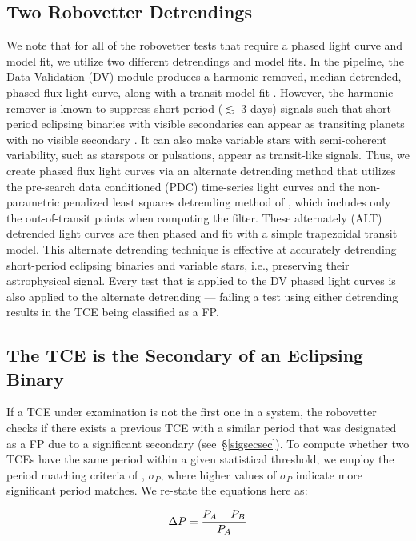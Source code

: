 \subsection{Two Robovetter Detrendings}
We note that for all of the robovetter tests that require a phased light curve and model fit, we utilize two different detrendings and model fits. In the \kepler{} pipeline, the Data Validation (DV) module produces a harmonic-removed, median-detrended, phased flux light curve, along with a transit model fit \citep{Wu2010}. However, the harmonic remover is known to suppress short-period ($\lesssim$ 3 days) signals such that short-period eclipsing binaries with visible secondaries can appear as transiting planets with no visible secondary \citep{Christiansen2013b}. It can also make variable stars with semi-coherent variability, such as starspots or pulsations, appear as transit-like signals. Thus, we create phased flux light curves via an alternate detrending method that utilizes the pre-search data conditioned (PDC) time-series light curves and the non-parametric penalized least squares detrending method of \citet{Garcia2010}, which includes only the out-of-transit points when computing the filter. These alternately (ALT) detrended light curves are then phased and fit with a simple trapezoidal transit model. This alternate detrending technique is effective at accurately detrending short-period eclipsing binaries and variable stars, i.e., preserving their astrophysical signal. Every test that is applied to the DV phased light curves is also applied to the alternate detrending --- failing a test using either detrending results in the TCE being classified as a FP.

\subsection{The TCE is the Secondary of an Eclipsing Binary}

If a TCE under examination is not the first one in a system, the robovetter checks if there exists a previous TCE with a similar period that was designated as a FP due to a significant secondary (see~\S\ref{sigsecsec}). To compute whether two TCEs have the same period within a given statistical threshold, we employ the period matching criteria of \citet[][see equations 1-3]{Coughlin2014a}, $\sigma_{P}$, where higher values of $\sigma_{P}$ indicate more significant period matches. We re-state the equations here as:

\begin{equation}
\label{peq1}
\Delta P = \frac{P_{A}-P_{B}}{P_{A}}\\
\end{equation}

